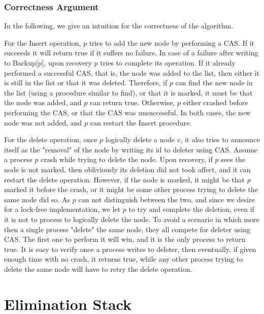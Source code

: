 \subsubsection*{Correctness Argument}
In the following, we give an intuition for the correctness of the algorithm.

For the Insert operation, $p$ tries to add the new node by performing a CAS. If it succeeds it will return true if it suffers no failure. In case of a failure after writing to Backup[p], upon recovery $p$ tries to complete its operation. If it already performed a successful CAS, that is, the node was added to the list, then either it is still in the list or that it was deleted. Therefore, if $p$ can find the new node in the list (using a procedure similar to find), or that it is marked, it must be that the node was added, and $p$ can return true. Otherwise, $p$ either crashed before performing the CAS, or that the CAS was unsuccessful. In both cases, the new node was not added, and $p$ can restart the Insert procedure.

For the delete operation, once $p$ logically delete a node $v$, it also tries to announce itself as the "removal" of the node by writing its id to deleter using CAS. Assume a process $p$ crash while trying to delete the node. Upon recovery, if $p$ sees the node is not marked, then obliviously its deletion did not took affect, and it can restart the delete operation. However, if the node is marked, it might be that $p$ marked it before the crash, or it might be some other process trying to delete the same node did so. As $p$ can not distinguish between the two, and since we desire for a lock-free implementation, we let $p$ to try and complete the deletion, even if it is not to process to logically delete the node. To avoid a scenario in which more then a single process "delete" the same node, they all compete for deleter using CAS. The first one to perform it will win, and it is the only process to return true. It is easy to verify once a process writes to deleter, then eventually, if given enough time with no crash, it returns true, while any other process trying to delete the same node will have to retry the delete operation.


\section{Elimination Stack}

